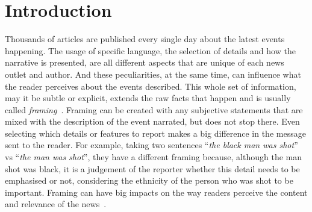 \chapter{Introduction}


Thousands of articles are published every single day about the latest events happening.
The usage of specific language, the selection of details and how the narrative is presented, are all different aspects that are unique of each news outlet and author.
And these peculiarities, at the same time, can influence what the reader perceives about the events described.
This whole set of information, may it be subtle or explicit, extends the raw facts that happen and is usually called \emph{framing}~\cite{gamson1989media,scheufele1999framing}.
Framing can be created with any subjective statements that are mixed with the description of the event narrated, but does not stop there.
Even selecting which details or features to report makes a big difference in the message sent to the reader.
For example, taking two sentences ``\textit{the black man was shot}'' vs ``\textit{the man was shot}'', they have a different framing because, although the man shot was black, it is a judgement of the reporter whether this detail needs to be emphasised or not, considering the ethnicity of the person who was shot to be important. %
Framing can have big impacts on the way readers perceive the content and relevance of the news~\cite{cohen2015press}. %



